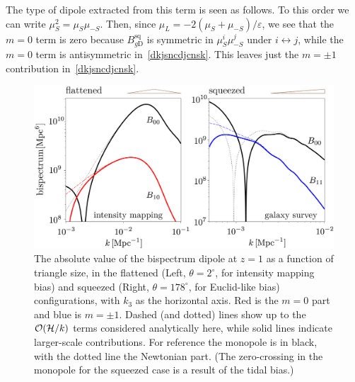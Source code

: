 The type of dipole extracted from this term is seen as follows. To this order we can write $\mu_{S}^2=\mu_{S}\mu_{-S}$. Then,  since $\mu_L=-2(\mu_S+\mu_{-S})/
\varepsilon$, we see that the $m=0$ term is zero because $B_{g {\mathrm{D}}}^{\mathrm{sq}}$ is symmetric in $\mu_{S}^i\mu_{-S}^j$ under $i\leftrightarrow j$, while the $m=0$ term is antisymmetric in~\eqref{dkjsncdjcnsk}. This leaves just the $m=\pm1$ contribution in~\eqref{dkjsncdjcnsk}.

\begin{figure}[!ht]
\begin{center}
\includegraphics[width=\columnwidth]{fig/figuresv2-02}
\caption{ The absolute value of the bispectrum dipole at $z=1$  as a function of triangle size, in the flattened (Left, $\theta=2^\circ$, for intensity mapping bias) and squeezed (Right, $\theta=178^\circ$, for Euclid-like bias) configurations, with $k_3$ as the horizontal axis. Red is the $m=0$ part and blue is $m=\pm1$. Dashed (and dotted) lines show up to the $\mathcal{O}(\mathcal{H}/k)$ terms considered analytically here, while solid lines indicate larger-scale contributions. For reference the monopole is in black, with the dotted line the Newtonian part.  (The zero-crossing in the monopole for the squeezed case is a result of the tidal bias.)}
\label{snakcjnsdlkcans}
\end{center}
\end{figure}
